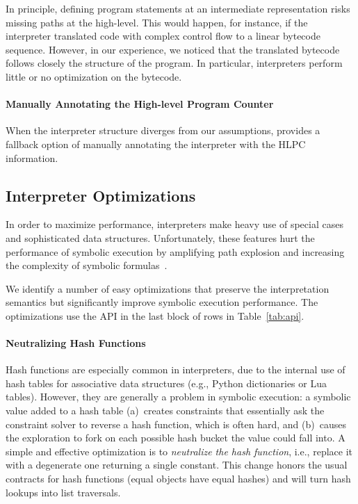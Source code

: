 In principle, defining program statements at an intermediate representation risks missing paths at the high-level.
%
This would happen, for instance, if the interpreter translated code with complex control flow to a linear bytecode sequence.
%
However, in our experience, we noticed that the translated bytecode follows closely the structure of the program.
%
In particular, interpreters perform little or no optimization on the bytecode.

\paragraph{Manually Annotating the High-level Program Counter}

When the interpreter structure diverges from our assumptions, \chef provides a fallback option of manually annotating the interpreter with the HLPC information.

\subsection{Interpreter Optimizations}
\label{sec:chef:optimzeforsymbex}

In order to maximize performance, interpreters make heavy use of special cases and sophisticated data structures.  Unfortunately, these features hurt the performance of symbolic execution by amplifying path explosion and increasing the complexity of symbolic formulas~\cite{overify}.

We identify a number of easy optimizations that preserve the interpretation semantics but significantly improve symbolic execution performance.  The optimizations use the \chef API in the last block of rows in Table~\ref{tab:api}.

\paragraph{Neutralizing Hash Functions}

Hash functions are especially common in interpreters, due to the internal use of hash tables for associative data structures (e.g., Python dictionaries or Lua tables).  However, they are generally a problem in symbolic execution: a symbolic value added to a hash table (a)~creates constraints that essentially ask the constraint solver to reverse a hash function, which is often hard, and (b)~causes the exploration to fork on each possible hash bucket the value could fall into.
%
A simple and effective optimization is to \emph{neutralize the hash function}, i.e., replace it with a degenerate one returning a single constant. This change honors the usual contracts for hash functions (equal objects have equal hashes) and will turn hash lookups into list traversals.

